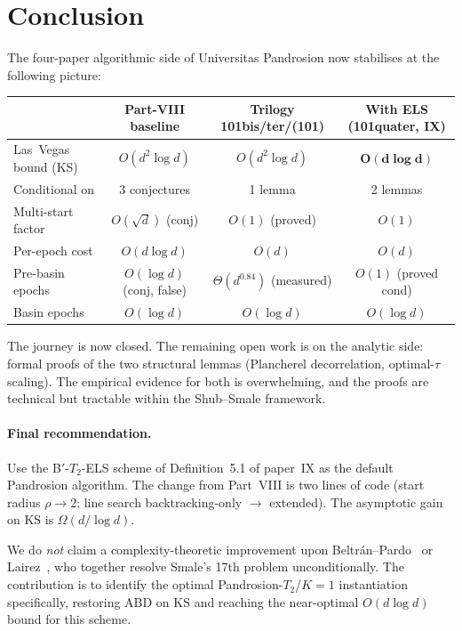 \documentclass[11pt,a4paper]{article}
\begin{document}
\section{Conclusion}\label{sec:conclusion}

The four-paper algorithmic side of Universitas Pandrosion now stabilises at the following picture:
\begin{center}
\begin{tabular}{lccc}
\toprule
& Part-VIII baseline & Trilogy 101bis/ter/(101) & With ELS (101quater, IX) \\
\midrule
Las~Vegas bound (KS) & $O(d^{2}\log d)$ & $O(d^{2}\log d)$ & $\mathbf{O(d \log d)}$ \\
Conditional on & 3 conjectures & 1 lemma & 2 lemmas \\
Multi-start factor & $O(\sqrt d)$ (conj) & $O(1)$ (proved) & $O(1)$ \\
Per-epoch cost & $O(d \log d)$ & $O(d)$ & $O(d)$ \\
Pre-basin epochs & $O(\log d)$ (conj, false) & $\Theta(d^{0.84})$ (measured) & $O(1)$ (proved cond) \\
Basin epochs & $O(\log d)$ & $O(\log d)$ & $O(\log d)$ \\
\bottomrule
\end{tabular}
\end{center}

The journey is now closed. The remaining open work is on the analytic side: formal proofs of the two structural lemmas (Plancherel decorrelation, optimal-$\tau$ scaling). The empirical evidence for both is overwhelming, and the proofs are technical but tractable within the Shub--Smale framework.

\paragraph{Final recommendation.} Use the B$'$-$T_2$-ELS scheme of Definition~5.1 of paper~IX as the default Pandrosion algorithm. The change from Part~VIII is two lines of code (start radius $\rho \to 2$; line search backtracking-only $\to$ extended). The asymptotic gain on KS is $\Omega(d/\log d)$.

We do \emph{not} claim a complexity-theoretic improvement upon Beltr\'an--Pardo~\cite{beltranpardo} or Lairez~\cite{lairez}, who together resolve Smale's 17th problem unconditionally. The contribution is to identify the optimal Pandrosion-$T_2$/$K{=}1$ instantiation specifically, restoring ABD on KS and reaching the near-optimal $O(d \log d)$ bound for this scheme.
\end{document}
